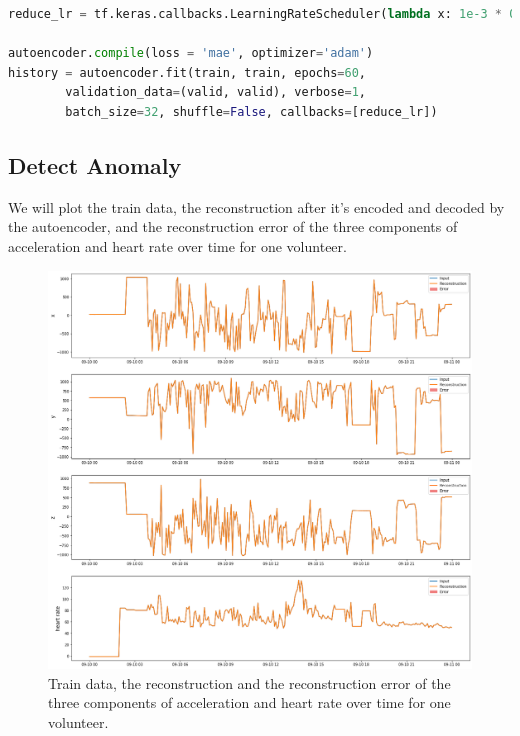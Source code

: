 \begin{lstlisting}[language=Python]
reduce_lr = tf.keras.callbacks.LearningRateScheduler(lambda x: 1e-3 * 0.90 ** x)

autoencoder.compile(loss = 'mae', optimizer='adam')
history = autoencoder.fit(train, train, epochs=60, 
		validation_data=(valid, valid), verbose=1, 
		batch_size=32, shuffle=False, callbacks=[reduce_lr])
\end{lstlisting}





\subsection*{Detect Anomaly}\label{Detect Anomaly}

We will plot the train data, the reconstruction after it's encoded and decoded by the autoencoder, and the reconstruction error of the three components of acceleration and heart rate over time for one volunteer.

\begin{figure}[H]
\centering
  \includegraphics[scale=0.35]{img/task_2/reconstructions_train.png}
  \caption{Train data, the reconstruction and the reconstruction error of the three components of acceleration and heart rate over time for one volunteer.}
  \label{fig: rec train}
\end{figure}

